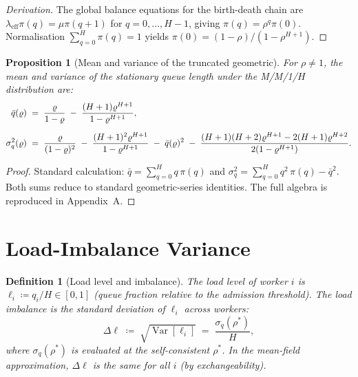 \documentclass[11pt,a4paper]{article}
\newtheorem{proposition}[theorem]{Proposition}
\newtheorem{definition}{Definition}[section]
\newcommand{\Var}[1]{\operatorname{Var}\!\left[#1\right]}
\begin{document}
\begin{proof}[Derivation]
The global balance equations for the birth-death chain are
$\lambda_{\text{eff}}\pi(q) = \mu\pi(q+1)$ for $q = 0,\ldots,H-1$,
giving $\pi(q) = \rho^q\pi(0)$.  Normalisation
$\sum_{q=0}^{H}\pi(q) = 1$ yields $\pi(0) = (1-\rho)/(1-\rho^{H+1})$.
\end{proof}

\begin{proposition}[Mean and variance of the truncated geometric]
\label{prop:moments}
For $\rho \neq 1$, the mean and variance of the stationary
queue length under the M/M/1/$H$ distribution are:
\begin{align}
  \bar{q}(\rho) &\;=\; \frac{\rho}{1-\rho}
    \;-\; \frac{(H+1)\rho^{H+1}}{1-\rho^{H+1}},
  \label{eq:mean}\\[6pt]
  \sigma^2_q(\rho) &\;=\; \frac{\rho}{(1-\rho)^2}
    \;-\; \frac{(H+1)^2\rho^{H+1}}{1-\rho^{H+1}}
    \;-\; \bar{q}(\rho)^2
    \;-\; \frac{(H+1)(H+2)\rho^{H+1} - 2(H+1)\rho^{H+2}}{%
          2(1-\rho^{H+1})}.
  \label{eq:var}
\end{align}
\end{proposition}

\begin{proof}
Standard calculation: $\bar{q} = \sum_{q=0}^{H} q\,\pi(q)$ and
$\sigma^2_q = \sum_{q=0}^{H} q^2\,\pi(q) - \bar{q}^2$.
Both sums reduce to standard geometric-series identities.
The full algebra is reproduced in Appendix~A.
\end{proof}

\section{Load-Imbalance Variance}

\begin{definition}[Load level and imbalance]
\label{def:imbalance}
The \emph{load level} of worker $i$ is $\ell_i \coloneqq q_i / H
\in [0,1]$ (queue fraction relative to the admission threshold).
The \emph{load imbalance} is the standard deviation of $\ell_i$
across workers:
\[
  \Delta\ell \;\coloneqq\; \sqrt{\Var{\ell_i}}
             \;=\; \frac{\sigma_q(\rho^*)}{H},
\]
where $\sigma_q(\rho^*)$ is evaluated at the self-consistent
$\rho^*$.  In the mean-field approximation, $\Delta\ell$ is the
same for all $i$ (by exchangeability).
\end{definition}
\end{document}
